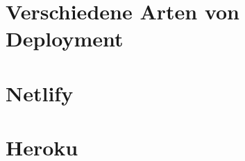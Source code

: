 \section{Verschiedene Arten von Deployment}
\lipsum[1-2]

\section{Netlify}
\lipsum[1-2]

\section{Heroku}
\lipsum[1-2]